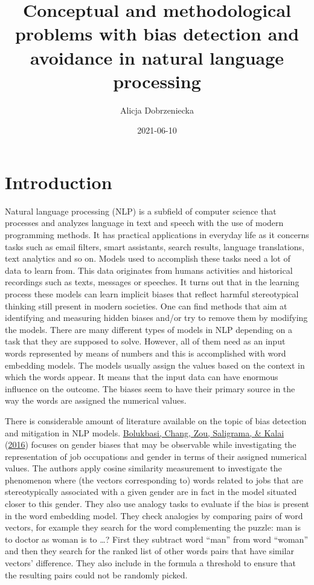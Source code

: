 \documentclass[
  12pt,
]{book}
\title{Conceptual and methodological problems with bias detection and avoidance in natural language processing}
\author{Alicja Dobrzeniecka}
\date{2021-06-10}
\begin{document}
\maketitle

{
\setcounter{tocdepth}{5}
\tableofcontents
}
\hypertarget{introduction}{%
\chapter{Introduction}\label{introduction}}

Natural language processing (NLP) is a subfield of computer science that processes and analyzes language in text and speech
with the use of modern programming methods. It has practical applications in everyday life as it concerns tasks such as email filters,
smart assistants, search results, language translations, text analytics and so on. Models used to accomplish these tasks need a lot of
data to learn from. This data originates from humans activities and historical recordings such as texts, messages or speeches. It turns out
that in the learning process these models can learn implicit biases that reflect harmful stereotypical thinking still present in modern societies. One can find methods that aim at identifying and measuring hidden biases and/or try to remove them by modifying the models.
There are many different types of models in NLP depending on a task that they are supposed to solve. However, all of them need as an input words represented by means of numbers and this is accomplished with word embedding models. The models usually assign the values based on the context in which the words appear. It means that the input data can have enormous influence on the outcome. The biases seem to have their primary source in the way the words are assigned the numerical values.

There is considerable amount of literature available on the topic of bias detection and mitigation in NLP models. \protect\hyperlink{ref-Bolukbasi2016Man}{Bolukbasi, Chang, Zou, Saligrama, \& Kalai} (\protect\hyperlink{ref-Bolukbasi2016Man}{2016}) focuses on gender biases that may be observable while investigating the representation of job occupations and gender in terms of their assigned numerical
values. The authors apply cosine similarity measurement to investigate the phenomenon where (the vectors corresponding to) words related to jobs that are stereotypically associated with a given gender are in fact in the model situated closer to this gender.
They also use analogy tasks to evaluate if the bias is present in the word embedding model. They check analogies by comparing pairs of word vectors, for example they search for the word complementing the puzzle: man is to doctor as woman is to \ldots? First they subtract word ``man'' from word ``woman'' and then
they search for the ranked list of other words pairs that have similar vectors' difference. They also include in the formula a threshold to ensure that the resulting pairs could not be randomly picked.
\end{document}
